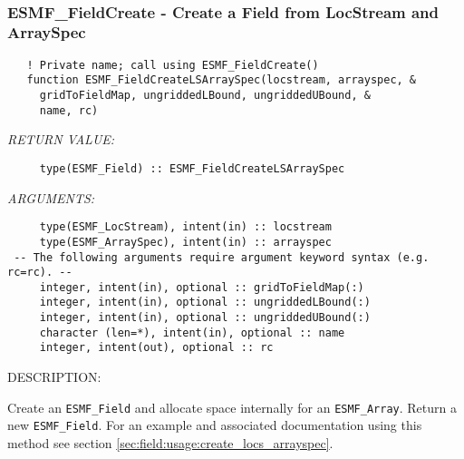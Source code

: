  
\mbox{}\hrulefill\ 
 
\subsubsection [ESMF\_FieldCreate] {ESMF\_FieldCreate - Create a Field from LocStream and ArraySpec}


\begin{verbatim}   ! Private name; call using ESMF_FieldCreate()
   function ESMF_FieldCreateLSArraySpec(locstream, arrayspec, &
     gridToFieldMap, ungriddedLBound, ungriddedUBound, &
     name, rc)\end{verbatim}{\em RETURN VALUE:}
\begin{verbatim}     type(ESMF_Field) :: ESMF_FieldCreateLSArraySpec\end{verbatim}{\em ARGUMENTS:}
\begin{verbatim}     type(ESMF_LocStream), intent(in) :: locstream
     type(ESMF_ArraySpec), intent(in) :: arrayspec
 -- The following arguments require argument keyword syntax (e.g. rc=rc). --
     integer, intent(in), optional :: gridToFieldMap(:)
     integer, intent(in), optional :: ungriddedLBound(:)
     integer, intent(in), optional :: ungriddedUBound(:)
     character (len=*), intent(in), optional :: name
     integer, intent(out), optional :: rc\end{verbatim}
{\sf DESCRIPTION:\\ }


   Create an {\tt ESMF\_Field} and allocate space internally for an
   {\tt ESMF\_Array}. Return a new {\tt ESMF\_Field}. For an example and
   associated documentation using this method see section
   \ref{sec:field:usage:create_locs_arrayspec}.
  
